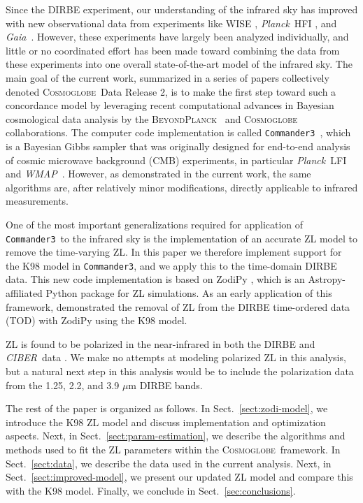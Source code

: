 \documentclass[twocolumn]{aa}
\def\commanderthree{\texttt{Commander3}}
\def\Planck{\textit{Planck}}
\def\WMAP{\textit{WMAP}}
\def\GAIA{\textit{Gaia}}
\def\CIBER{\textit{CIBER}}
\newcommand{\BP}{\textsc{BeyondPlanck}}
\newcommand{\cosmoglobe}{\textsc{Cosmoglobe}}
\begin{document}
Since the DIRBE experiment, our
understanding of the infrared sky has improved with new observational
data from experiments like WISE \citep{wright:2010}, \Planck\ HFI
\citep{planck2016-l03}, and \GAIA\ \citep{gaia:2016}. However, these
experiments have largely been analyzed individually, and little or no
coordinated effort has been made toward combining the data from these
experiments into one overall state-of-the-art model of the infrared
sky. The main goal of the current work, summarized in a series of
papers collectively denoted \cosmoglobe\ Data Release 2, is to make
the first step toward such a concordance model by leveraging recent
computational advances in Bayesian cosmological data analysis by the
\BP\ \citep[][and references therein]{BP2023,Galloway2023} and
\cosmoglobe\ \citep{Watts2023} collaborations. The computer code
implementation is called \commanderthree\ \citep{Galloway2023}, which
is a Bayesian Gibbs sampler that was originally designed for
end-to-end analysis of cosmic microwave background (CMB) experiments,
in particular \Planck\ LFI \citep{planck2016-l02} and \WMAP\
\citep{bennett2012}. However, as demonstrated in the current work, the
same algorithms are, after relatively minor modifications, directly
applicable to infrared measurements.

One of the most important generalizations required for application of
\commanderthree\ to the infrared sky is the implementation of an
accurate ZL model to remove the time-varying ZL. In this paper we therefore implement
support for the K98 model in \commanderthree, and we apply this to the
time-domain DIRBE data. This new code implementation is based on ZodiPy 
\citep{San2024}, which is an Astropy-affiliated Python package for ZL 
simulations. As an early application of this framework, \cite{San2022} 
demonstrated the removal of ZL from the DIRBE time-ordered data (TOD) with ZodiPy using the 
K98 model.

ZL is found to be polarized in the near-infrared in both the DIRBE and 
\CIBER\ data \citep{Takimoto2022,Takimoto2023}. We make no attempts at 
modeling polarized ZL in this analysis, but a natural next step in this 
analysis would be to include the polarization data from the 1.25, 2.2, 
and 3.9 $\mu$m DIRBE bands.

The rest of the paper is organized as follows. In
Sect.~\ref{sect:zodi-model}, we introduce the K98 ZL model and discuss
implementation and optimization aspects. Next, in 
Sect.~\ref{sect:param-estimation}, we describe the algorithms and methods
used to fit the ZL parameters within the \cosmoglobe\  framework.
In Sect.~\ref{sect:data}, we describe the data used in the current
analysis. Next, in Sect.~\ref{sect:improved-model}, we present our updated 
ZL model and compare this with the K98 model. Finally, we
conclude in Sect.~\ref{sec:conclusions}.
\end{document}
